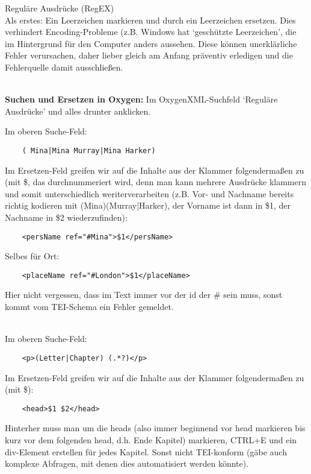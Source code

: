 \begin{frame}{Reguläre Ausdrücke (RegEX)}
\footnotesize
{}\\
Als erstes: Ein Leerzeichen markieren und durch ein Leerzeichen ersetzen. Dies verhindert Encoding-Probleme (z.B. Windows hat `geschützte Leerzeichen', die im Hintergrund für den Computer anders aussehen. Diese können unerklärliche Fehler verursachen, daher lieber gleich am Anfang präventiv erledigen und die Fehlerquelle damit ausschließen.
\medskip


\\
\textbf{Suchen und Ersetzen in Oxygen:} Im OxygenXML-Suchfeld `Reguläre Ausdrücke' und alles drunter anklicken.

Im oberen Suche-Feld:
\begin{verbatim}
    ( Mina|Mina Murray|Mina Harker)
\end{verbatim}

Im Ersetzen-Feld greifen wir auf die Inhalte aus der Klammer folgendermaßen zu (mit \$, das durchnummeriert wird, denn man kann mehrere Ausdrücke klammern und somit unterschiedlich weriterverarbeiten (z.B. Vor- und Nachname bereits richtig kodieren mit (Mina)(Murray|Harker), der Vorname ist dann in \$1, der Nachname in \$2 wiederzufinden):
\begin{verbatim}
    <persName ref="#Mina">$1</persName>
\end{verbatim}

Selbes für Ort:
\begin{verbatim}
    <placeName ref="#London">$1</placeName>
\end{verbatim}

Hier nicht vergessen, dass im Text immer vor der id der \# sein muss, sonst kommt vom TEI-Schema ein Fehler gemeldet.

\medskip

\\
Im oberen Suche-Feld:
\begin{verbatim}
    <p>(Letter|Chapter) (.*?)</p>
\end{verbatim}

Im Ersetzen-Feld greifen wir auf die Inhalte aus der Klammer folgendermaßen zu (mit \$):
\begin{verbatim}
    <head>$1 $2</head>
\end{verbatim}

Hinterher muss man um die heads (also immer beginnend vor head markieren bis kurz vor dem folgenden head, d.h. Ende Kapitel) markieren, CTRL+E und ein div-Element erstellen für jedes Kapitel. Sonst nicht TEI-konform (gäbe auch komplexe Abfragen, mit denen dies automatisiert werden könnte).
\medskip


\end{frame}
